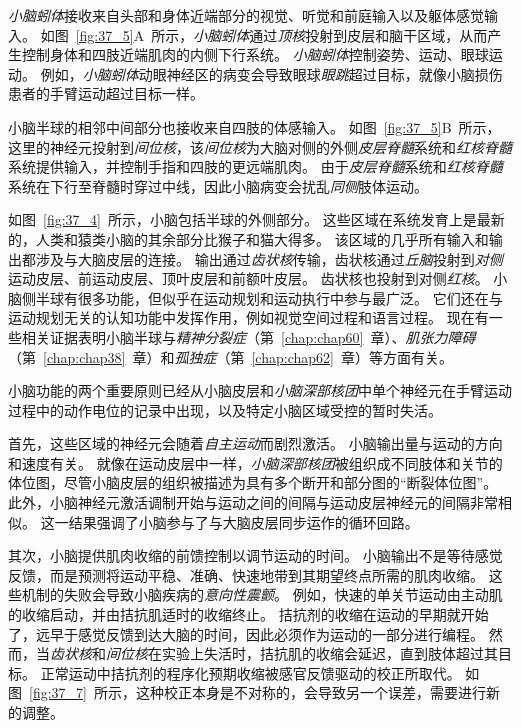\textit{小脑蚓体}接收来自头部和身体近端部分的视觉、听觉和前庭输入以及躯体感觉输入。
如图~\ref{fig:37_5}A~所示，\textit{小脑蚓体}通过\textit{顶核}投射到皮层和脑干区域，从而产生控制身体和四肢近端肌肉的内侧下行系统。
\textit{小脑蚓体}控制姿势、运动、眼球运动。
例如，\textit{小脑蚓体}动眼神经区的病变会导致眼球\textit{眼跳}超过目标，就像小脑损伤患者的手臂运动超过目标一样。


小脑半球的相邻中间部分也接收来自四肢的体感输入。
如图~\ref{fig:37_5}B~所示，这里的神经元投射到\textit{间位核}，该\textit{间位核}为大脑对侧的外侧\textit{皮层脊髓}系统和\textit{红核脊髓}系统提供输入，并控制手指和四肢的更远端肌肉。
由于\textit{皮层脊髓}系统和\textit{红核脊髓}系统在下行至脊髓时穿过中线，因此小脑病变会扰乱\textit{同侧}肢体运动。


如图~\ref{fig:37_4}~所示，小脑包括半球的外侧部分。
这些区域在系统发育上是最新的，人类和猿类小脑的其余部分比猴子和猫大得多。
该区域的几乎所有输入和输出都涉及与大脑皮层的连接。
输出通过\textit{齿状核}传输，齿状核通过\textit{丘脑}投射到\textit{对侧}运动皮层、前运动皮层、顶叶皮层和前额叶皮层。
齿状核也投射到对侧\textit{红核}。
小脑侧半球有很多功能，但似乎在运动规划和运动执行中参与最广泛。
它们还在与运动规划无关的认知功能中发挥作用，例如视觉空间过程和语言过程。
现在有一些相关证据表明小脑半球与\textit{精神分裂症}（第~\ref{chap:chap60}~章）、\textit{肌张力障碍}（第~\ref{chap:chap38}~章）和\textit{孤独症}（第~\ref{chap:chap62}~章）等方面有关。


小脑功能的两个重要原则已经从小脑皮层和\textit{小脑深部核团}中单个神经元在手臂运动过程中的动作电位的记录中出现，以及特定小脑区域受控的暂时失活。


首先，这些区域的神经元会随着\textit{自主运动}而剧烈激活。
小脑输出量与运动的方向和速度有关。
就像在运动皮层中一样，\textit{小脑深部核团}被组织成不同肢体和关节的体位图，尽管小脑皮层的组织被描述为具有多个断开和部分图的“断裂体位图”。
此外，小脑神经元激活调制开始与运动之间的间隔与运动皮层神经元的间隔非常相似。
这一结果强调了小脑参与了与大脑皮层同步运作的循环回路。


其次，小脑提供肌肉收缩的前馈控制以调节运动的时间。
小脑输出不是等待感觉反馈，而是预测将运动平稳、准确、快速地带到其期望终点所需的肌肉收缩。
这些机制的失败会导致小脑疾病的\textit{意向性震颤}。
例如，快速的单关节运动由主动肌的收缩启动，并由拮抗肌适时的收缩终止。
拮抗剂的收缩在运动的早期就开始了，远早于感觉反馈到达大脑的时间，因此必须作为运动的一部分进行编程。
然而，当\textit{齿状核}和\textit{间位核}在实验上失活时，拮抗肌的收缩会延迟，直到肢体超过其目标。
正常运动中拮抗剂的程序化预期收缩被感官反馈驱动的校正所取代。
如图~\ref{fig:37_7}~所示，这种校正本身是不对称的，会导致另一个误差，需要进行新的调整。


